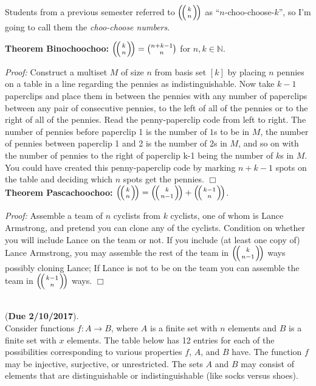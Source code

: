\documentclass[10pt, AMS Euler]{article}
\newcommand{\N}{\mathbb{N}}
\begin{document}
\begin{enumerate}
Students from a previous semester referred to $\left(\!\left(k \atop n \right)\!\right)$ as
``$n$-choo-choose-$k$'', so I'm going to call them the \emph{choo-choose numbers}.

{\bf Theorem Binochoochoo:} $\left(\!\left(k \atop n \right)\!\right) = \binom{n + k -1}{n}$ for $n, k \in \N$.

\emph{Proof:}  Construct a multiset $M$ of size $n$ from basis set $[k]$ by placing $n$ pennies on a table in a line regarding the pennies as
indistinguishable.  Now take $k-1$ paperclips and place them in between the pennies with any number of paperclips between any pair of
consecutive pennies, to the left of all of the pennies or to the right of all of the pennies.
Read the penny-paperclip code from left to right.  The number of pennies before paperclip 1 is the number of $1$s to be in $M$,
the number of pennies between paperclip 1 and 2 is the number of $2$s in $M$, and so on with the number of pennies to the
right of paperclip k-1 being the number of $k$s in $M$.  You could have created this penny-paperclip code by
marking $n+k-1$ spots on the table and deciding which $n$ spots get the pennies. \hfill $\Box$\\

{\bf Theorem Pascachoochoo:} $\left(\!\left(k \atop n \right)\!\right) = \left(\!\left(k \atop n-1 \right)\!\right)+\left(\!\left(k-1 \atop n \right)\!\right)$.

\emph{Proof:} Assemble a team of $n$ cyclists from $k$ cyclists, one of whom is Lance Armstrong, and pretend you can clone any of the cyclists.
Condition on whether you will include Lance on the team or not.  If you include (at least one copy of) Lance Armstrong, you may
assemble the rest of the team in $\left(\!\left(k \atop n -1 \right)\!\right)$ ways possibly cloning Lance;
If Lance is not to be on the team you can assemble the team in $\left(\!\left(k -1\atop n \right)\!\right)$ ways. \hfill $\Box$\\

\end{enumerate}



\noindent \underline{\hspace{3in}}\\

 ({\bf Due 2/10/2017}).\\ %

\noindent  Consider functions $f:A \to B$, where $A$ is a finite set with $n$ elements and $B$ is a finite set with $x$ elements.
The table below has 12 entries for each of the possibilities corresponding to various properties $f$, $A$, and $B$ have.
The function $f$ may be injective, surjective, or unrestricted.  The sets $A$ and $B$ may consist of elements that are distinguishable or indistinguishable
(like socks versus shoes).
\end{document}

